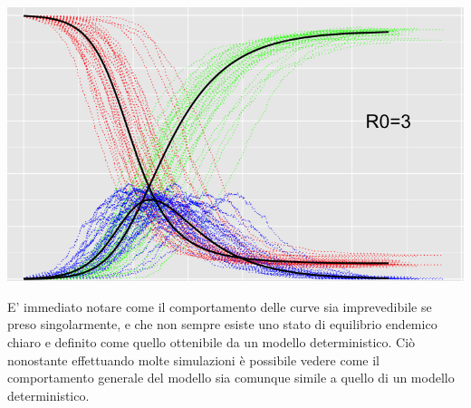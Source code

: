 \begin{minipage}{\linewidth}
    \centering
    \includegraphics[width=\textwidth]{img/Gillespie-e1643395123662.png}
    \label{fig:Endemic_equilibrium_stochastic_sir}
\end{minipage}

E' immediato notare come il comportamento delle curve sia 
imprevedibile se preso singolarmente, e che non sempre 
esiste uno stato di equilibrio endemico chiaro e definito come
quello ottenibile da un modello deterministico. Ciò nonostante 
effettuando molte simulazioni è possibile vedere come il 
comportamento generale del modello sia comunque simile a 
quello di un modello deterministico.